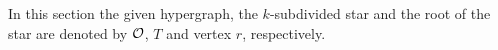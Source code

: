 \documentclass[MS]             %
              {iitmdiss_as}    %
\begin{document}
In this section the given hypergraph, the
$k$-subdivided star and the root of the star are denoted by ${\cal O}$, $T$ and vertex
$r$, respectively.

% 
\end{document}
